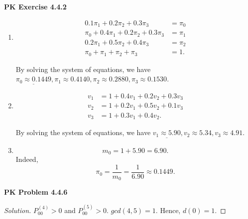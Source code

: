 \documentclass{article}
\begin{document}
\newpage
\textbf{PK Exercise 4.4.2}
\begin{enumerate}[label=(\alph*)]
    \item 
    \begin{align*}
        0.1\pi_1 + 0.2\pi_2 + 0.3\pi_3 & = \pi_0 \\
        \pi_0 + 0.4\pi_1 + 0.2\pi_2 + 0.3\pi_3 & = \pi_1 \\
        0.2\pi_1 + 0.5\pi_2 + 0.4\pi_3 & = \pi_2 \\
        \pi_0 + \pi_1 + \pi_2 + \pi_3 & = 1.
    \end{align*}

    By solving the system of equations, we have $\underline{\pi_0 \approx 0.1449}, \pi_1 \approx 0.4140, \pi_2 \approx 0.2880, \pi_3 \approx 0.1530$.

    \item
    \begin{align*}
        v_1 & = 1 + 0.4v_1 + 0.2v_2 + 0.3v_3 \\
        v_2 & = 1 + 0.2v_1 + 0.5v_2 + 0.1v_3 \\
        v_3 & = 1 + 0.3v_1 + 0.4v_2.
    \end{align*}
    
    By solving the system of equations, we have $\underline{v_1 \approx 5.90}, v_2 \approx 5.34, v_3 \approx 4.91$.

    \item
    $$m_0 = 1 + 5.90 = 6.90.$$
    Indeed, $$\pi_0 = \frac{1}{m_0} = \frac{1}{6.90} \approx 0.1449.$$
    
\end{enumerate}
\bigbreak


\textbf{PK Problem 4.4.6}
\begin{proof}[Solution]
    $P^{(4)}_{00} > 0$ and $P^{(5)}_{00} > 0$. $gcd(4,5) = 1$. Hence, $d(0) = 1$.
\end{proof}
\bigbreak
\end{document}
